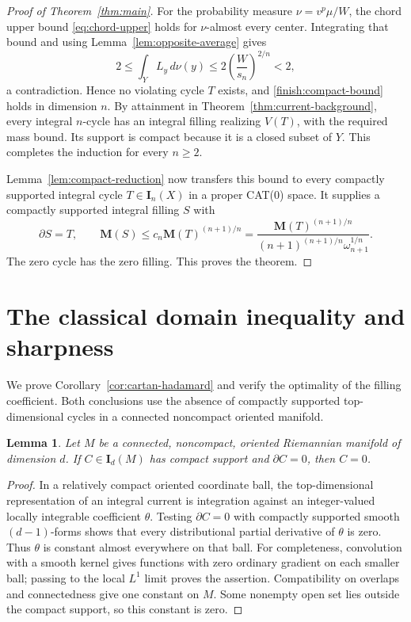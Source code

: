 \documentclass[11pt]{article}
\numberwithin{equation}{section}
\newtheorem{lemma}[theorem]{Lemma}
\theoremstyle{definition}
\theoremstyle{remark}
\begin{document}
\begin{proof}[Proof of Theorem~\ref{thm:main}]
For the probability measure \(\nu=v^p\mu/W\), the chord upper bound
\eqref{eq:chord-upper} holds for \(\nu\)-almost every center. Integrating
that bound and using Lemma~\ref{lem:opposite-average} gives
\[
 2\le\int_YL_y\,d\nu(y)
   \le2\left(\frac W{s_n}\right)^{2/n}<2,
\]
a contradiction. Hence no violating cycle \(T\) exists, and
\eqref{finish:compact-bound} holds in dimension \(n\). By attainment
in Theorem~\ref{thm:current-background}, every integral \(n\)-cycle
has an integral filling realizing \(V(T)\), with the required mass
bound. Its support is compact because it is a closed subset of \(Y\).
This completes the induction for every \(n\ge2\).

Lemma~\ref{lem:compact-reduction} now transfers this bound to every
compactly supported integral cycle \(T\in\mathbf I_n(X)\) in a proper
CAT(0) space. It supplies a compactly supported integral filling
\(S\) with
\[
 \partial S=T,\qquad
 \mathbf M(S)\le c_n\mathbf M(T)^{(n+1)/n}
 =\frac{\mathbf M(T)^{(n+1)/n}}
 {(n+1)^{(n+1)/n}\omega_{n+1}^{1/n}}.
\]
The zero cycle has the zero filling. This proves the theorem.
\end{proof}

\section{The classical domain inequality and sharpness}
\label{sec:classical}

We prove Corollary~\ref{cor:cartan-hadamard} and verify the optimality
of the filling coefficient. Both conclusions use the absence of
compactly supported top-dimensional cycles in a connected noncompact
oriented manifold.

\begin{lemma}\label{lem:top-dimensional-constancy}
Let $M$ be a connected, noncompact, oriented Riemannian manifold of
dimension $d$. If $C\in\mathbf I_d(M)$ has compact support and
$\partial C=0$, then $C=0$.
\end{lemma}

\begin{proof}
In a relatively compact oriented coordinate ball, the
top-dimensional representation of an integral current is integration
against an integer-valued locally integrable coefficient $\theta$.
Testing $\partial C=0$ with compactly supported smooth
$(d-1)$-forms shows that every distributional partial derivative of
$\theta$ is zero. Thus $\theta$ is constant almost everywhere on that
ball. For completeness, convolution with a smooth kernel gives
functions with zero ordinary gradient on each smaller ball; passing
to the local $L^1$ limit proves the assertion. Compatibility on
overlaps and connectedness give one constant on $M$. Some nonempty
open set lies outside the compact support, so this constant is zero.
\end{proof}
\end{document}
